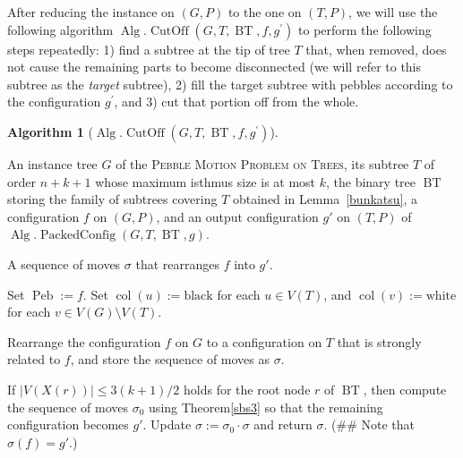 \documentclass[letter,11pt]{article}
\theoremstyle{definition}
\theoremstyle{definition}
\newtheorem{alg}{Algorithm}
\DeclareMathOperator{\BT}{BT}
\DeclareMathOperator{\Peb}{Peb}
\DeclareMathOperator{\col}{col}
\DeclareMathOperator{\Alg}{Alg}
\DeclareMathOperator{\PacCon}{PackedConfig}
\DeclareMathOperator{\CutOff}{CutOff}
\newcommand{\1}{\boldmath$~1~$\unboldmath}
\newcommand{\tume}{\hspace*{0.2em}}
\newcommand{\maru}[1]{{\ooalign{\hfill$\small#1$\hfill\crcr\scalebox{1.3}{$\bigcirc$}}}}
\newenvironment{alg-enumerate}{%
  \begin{enumerate}%
   \renewcommand{\theenumi}{\arabic{enumi}}%
   \renewcommand{\labelenumi}{\rm{{\maru{\theenumi}}\tume\/}}%
   \renewcommand{\labelenumii}{\rm{$(${\maru{\theenumi}}-\theenumii$)$\tume\/}}%
 }{\end{enumerate}%
}
\newcommand{\namelistlabel}[1]{\hspace*{10pt}\mbox{#1}:\hspace{\fill}}
\newenvironment{namelist}[1]{%
    \begin{list}{}
      {\let\makelabel\namelistlabel
      \settowidth{\labelwidth}{#1}
      \setlength{\leftmargin}{1.1\labelwidth}
      \setlength{\labelsep}{5pt}
      \setlength{\parsep}{0pt}}
  }{%
  \end{list}}
\begin{document}

After reducing the instance on $(G,P)$ to the one on $(T,P)$, we will use the following algorithm $\Alg.\CutOff(G,T,\BT,f,g^{\prime})$ to perform the following steps repeatedly: 1) find a subtree at the tip of tree $T$ that, when removed, does not cause the remaining parts to become disconnected (we will refer to this subtree as the {\it target} subtree), 2) fill the target subtree with pebbles according to the configuration $g^{\prime}$, and 3) cut that portion off from the whole. 
\begin{alg}[$\Alg.\CutOff(G,T,\BT,f,g^{\prime})$]\hfill
\begin{namelist}{OUTPUT}
\item[\sl Input]{An instance tree $G$ of the \textsc{Pebble Motion Problem on Trees}, 
its subtree $T$ of order $n+k+1$ whose maximum isthmus size is at most $k$, 
the binary tree $\BT$ storing the family of subtrees covering $T$ obtained in Lemma~\ref{bunkatsu}, 
a configuration $f$ on $(G,P)$, and an output configuration $g'$ on $(T,P)$ of $\Alg.\PacCon(G,T,\BT,g)$.}

\item[\sl Output]{A sequence of moves $\sigma$ that rearranges $f$ into $g'$.}
\end{namelist}

\begin{alg-enumerate}

\item
Set $\Peb := f$.  
Set $\col(u) := \mathrm{black}$ for each $u \in V(T)$, and  
$\col(v) := \mathrm{white}$ for each $v \in V(G)\setminus V(T)$.

\item
Rearrange the configuration $f$ on $G$ to a configuration on $T$ 
that is strongly related to $f$, and store the sequence of moves as $\sigma$.

\item
If $|V(X(r))|\le 3(k+1)/2$ holds for the root node $r$ of $\BT$, then  
compute the sequence of moves $\sigma_0$ using Theorem\tume\ref{sbs3} so that the remaining configuration becomes $g'$.  
Update $\sigma := \sigma_0\cdot\sigma$ and return $\sigma$.  
(\#\# Note that $\sigma(f)=g'$.)  
\label{initial-check}


\end{alg-enumerate}
\end{alg}
\end{document}
